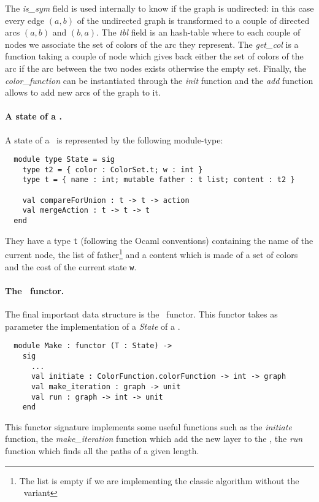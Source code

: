 The \textit{is\_sym} field is used internally to know if the graph is undirected: in this case every edge $(a, b)$ of the undirected graph is transformed to a couple of directed arcs $(a,b)$ and $(b,a)$. The \textit{tbl} field is an hash-table where to each couple of nodes we associate the set of colors of the arc they represent. The \textit{get\_col} is a function taking a couple of node which gives back either the set of colors of the arc if the arc between the two nodes exists otherwise the empty set. Finally, the \textit{color\_function} can be instantiated through the \textit{init} function and the \textit{add} function allows to add new arcs of the graph to it.

\paragraph{A state of a \mdd.} A state of a \mdd\ is represented by the following module-type:

\begin{verbatim}
  module type State = sig
    type t2 = { color : ColorSet.t; w : int }
    type t = { name : int; mutable father : t list; content : t2 }

    val compareForUnion : t -> t -> action
    val mergeAction : t -> t -> t
  end
\end{verbatim}

They have a type \texttt{t} (following the Ocaml conventions) containing the name of the current node, the list of father\footnote{The list is empty if we are implementing the classic algorithm without the \alldiff\ variant} and a content which is made of a set of colors and the cost of the current state \texttt{w}.

\paragraph{The \mdd\ functor.} The final important data structure is the \mdd\ functor. This functor takes as parameter the implementation of a \textit{State} of a \mdd.

\begin{verbatim}
  module Make : functor (T : State) ->
    sig
      ...
      val initiate : ColorFunction.colorFunction -> int -> graph
      val make_iteration : graph -> unit
      val run : graph -> int -> unit
    end
\end{verbatim}

This functor signature implements some useful functions such as the \textit{initiate} function, the \textit{make\_iteration} function which add the new layer to the \mdd, the \textit{run} function which finds all the paths of a given length.
